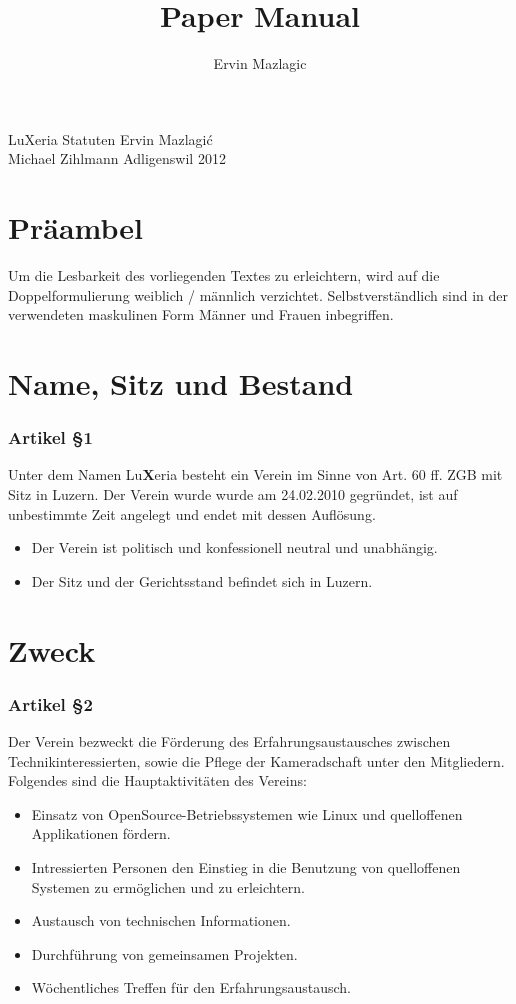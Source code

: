 \documentclass[a4paper,
               10pt,
               fleqn]{article}
\author{Ervin Mazlagic}
\title{Paper Manual}
\begin{document}
         {LuXeria Statuten}                     %
         {Ervin Mazlagi\'c\\Michael Zihlmann}   %
         {Adligenswil}                          %
         {2012}                                 %

\tableofcontents
\newpage



\section*{Präambel}
Um die Lesbarkeit des vorliegenden Textes zu
erleichtern, wird auf die Doppelformulierung weiblich /
männlich verzichtet. Selbstverständlich sind in der
verwendeten maskulinen Form Männer und Frauen inbegriffen.

\section{Name, Sitz und Bestand}

\subsubsection*{Artikel §1}
Unter dem Namen Lu\textbf{X}eria besteht ein Verein im
Sinne von Art. 60 ff. ZGB mit Sitz in Luzern. Der
Verein wurde wurde am 24.02.2010 gegründet, ist auf
unbestimmte Zeit angelegt und endet mit dessen Auflösung.
\begin{itemize}
\item Der Verein ist politisch und konfessionell neutral 
und unabhängig.
\item Der Sitz und der Gerichtsstand befindet sich in
Luzern.
\end{itemize}

\section{Zweck}

\subsubsection*{Artikel §2}
Der Verein bezweckt die Förderung des Erfahrungsaustausches 
zwischen Technikinteressierten, sowie die Pflege der
Kameradschaft unter den Mitgliedern.\newline \newline
Folgendes sind die Hauptaktivitäten des Vereins:
\begin{itemize}
\item Einsatz von OpenSource-Betriebssystemen wie Linux und
 quelloffenen Applikationen fördern.
\item Intressierten Personen den Einstieg in die Benutzung 
von quelloffenen Systemen zu ermöglichen und zu erleichtern.
\item Austausch von technischen Informationen.
\item Durchführung von gemeinsamen Projekten.
\item Wöchentliches Treffen für den Erfahrungsaustausch.
\end{itemize}
\end{document}

